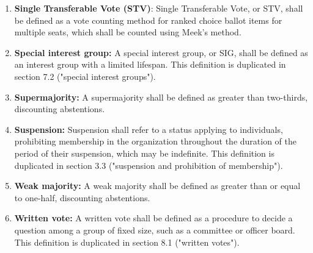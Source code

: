\documentclass[11pt]{article}
\newcounter{h1}
\newcounter{h2}[h1]
\newcounter{h3}[h2]
\begin{document}
\begin{enumerate}
\begin{enumerate}
      \item \textbf{Supermajority resolution:} A supermajority resolution shall be defined as a resolution which may be passed only by a supermajority formal vote ballot item.  
    \end{enumerate}
  \item \textbf{Single Transferable Vote (STV)}: Single Transferable Vote, or STV, shall be defined as a vote counting method for ranked choice ballot items for multiple seats, which shall be counted using Meek's method.  
  \item \textbf{Special interest group:} A special interest group, or SIG, shall be defined as an interest group with a limited lifespan. This definition is duplicated in section 7.2 ("special interest groups").  
  \item \textbf{Supermajority:} A supermajority shall be defined as greater than two-thirds, discounting abstentions.  
  \item \textbf{Suspension:} Suspension shall refer to a status applying to individuals, prohibiting membership in the organization throughout the duration of the period of their suspension, which may be indefinite. This definition is duplicated in section 3.3 ("suspension and prohibition of membership").  
  \item \textbf{Weak majority:} A weak majority shall be defined as greater than or equal to one-half, discounting abstentions.  
  \item \textbf{Written vote:} A written vote shall be defined as a procedure to decide a question among a group of fixed size, such as a committee or officer board. This definition is duplicated in section 8.1 ("written votes").
\end{enumerate}


\end{document}
